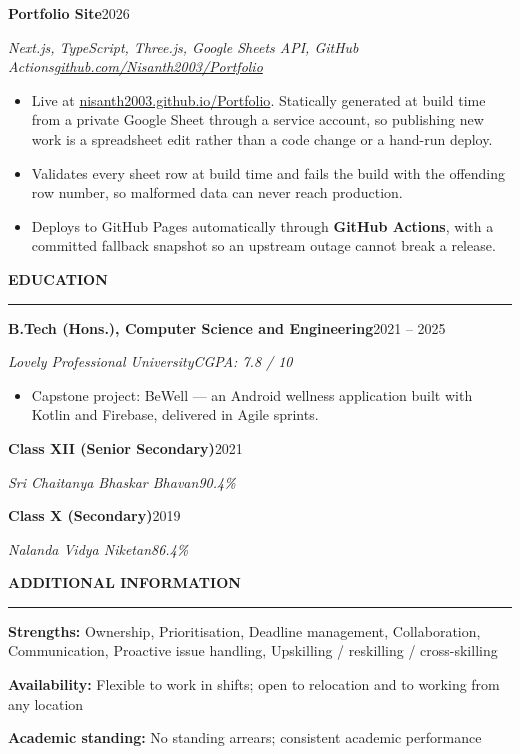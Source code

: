 \documentclass[11pt,a4paper]{article}
\newcommand{\resumeSection}[1]{%
  \vspace{7pt}%
  {\large\bfseries\color{primary}\MakeUppercase{#1}}\par
  \vspace{1pt}%
  \textcolor{secondary}{\rule{\textwidth}{0.6pt}}\par
  \vspace{3pt}%
}
\newcommand{\entryLine}[4]{%
  \par\vspace{3pt}%
  \begingroup\parfillskip=0pt\relax
    \noindent\textbf{#1}\hfill\textcolor{secondary}{#2}\par
    \noindent\textit{\textcolor{accent}{#3}}\hfill\textit{\textcolor{secondary}{#4}}\par
  \endgroup
  \vspace{1pt}%
}
\newenvironment{bullets}{%
  \begin{itemize}[leftmargin=1.4em, label=\textbullet, itemsep=1.5pt,
                  parsep=0pt, topsep=3pt, partopsep=0pt]
}{%
  \end{itemize}%
  \vspace{2pt}%
}
\newcommand{\skillRow}[2]{\textbf{#1:} #2\par\vspace{2pt}}
\begin{document}
\entryLine{Portfolio Site}{2026}{Next.js, TypeScript, Three.js, Google Sheets API, GitHub Actions}{\href{https://github.com/Nisanth2003/Portfolio}{github.com/Nisanth2003/Portfolio}}
\begin{bullets}
  \item Live at \href{https://nisanth2003.github.io/Portfolio/}{nisanth2003.github.io/Portfolio}.
        Statically generated at build time from a private Google Sheet through a service
        account, so publishing new work is a spreadsheet edit rather than a code change or
        a hand-run deploy.
  \item Validates every sheet row at build time and fails the build with the offending row
        number, so malformed data can never reach production.
  \item Deploys to GitHub Pages automatically through \textbf{GitHub Actions}, with a
        committed fallback snapshot so an upstream outage cannot break a release.
\end{bullets}

\resumeSection{Education}

\entryLine{B.Tech (Hons.), Computer Science and Engineering}{2021 -- 2025}{Lovely Professional University}{CGPA: 7.8 / 10}
\begin{bullets}
  \item Capstone project: BeWell --- an Android wellness application built with Kotlin and
        Firebase, delivered in Agile sprints.
\end{bullets}

\entryLine{Class XII (Senior Secondary)}{2021}{Sri Chaitanya Bhaskar Bhavan}{90.4\%}
\entryLine{Class X (Secondary)}{2019}{Nalanda Vidya Niketan}{86.4\%}

\resumeSection{Additional Information}

\skillRow{Strengths}{Ownership, Prioritisation, Deadline management, Collaboration, Communication, Proactive issue handling, Upskilling / reskilling / cross-skilling}
\skillRow{Availability}{Flexible to work in shifts; open to relocation and to working from any location}
\skillRow{Academic standing}{No standing arrears; consistent academic performance}
\end{document}
